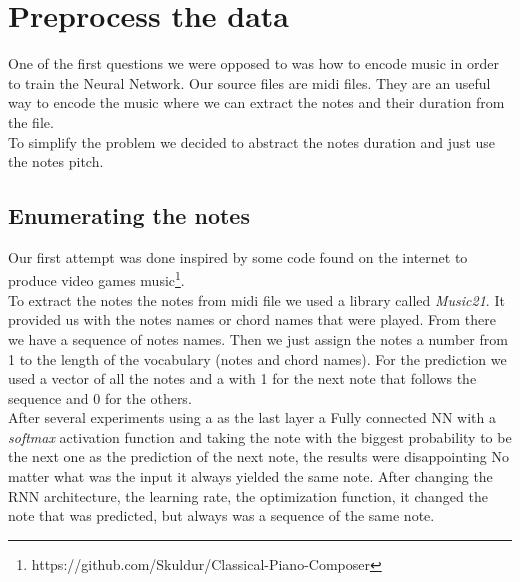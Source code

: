 \documentclass[11pt]
{article}
\begin{document}


\section{Preprocess the data}
One of the first questions we were opposed to was how to encode music in order to train the Neural Network. Our source files are midi files. They are an useful way to encode the music where we can extract the notes and their duration from the file.\\
To simplify the problem we decided to abstract the notes duration and just use the notes pitch. \\

\subsection{Enumerating the notes}
Our first attempt was done inspired by some code found on the internet to produce video games music\footnote{https://github.com/Skuldur/Classical-Piano-Composer}.\\
To extract the notes the notes from midi file we used a library called \textit{Music21}. It provided us with the notes names or chord names that were played. From there we have a sequence of notes names. Then we just assign the notes a number from 1 to the length of the vocabulary (notes and chord names).
For the prediction we used a vector of all the notes and a with 1 for the next note that follows the sequence and 0 for the others.\\
After several experiments using a as the last layer a Fully connected NN with a \textit{softmax} activation function and taking the note with the biggest probability to be the next one as the prediction of the next note, the results were disappointing
 No matter what was the input it always yielded the same note. After changing the RNN architecture, the learning rate, the optimization function, it changed the note that was predicted, but always was a sequence of the same  note.
\end{document}
